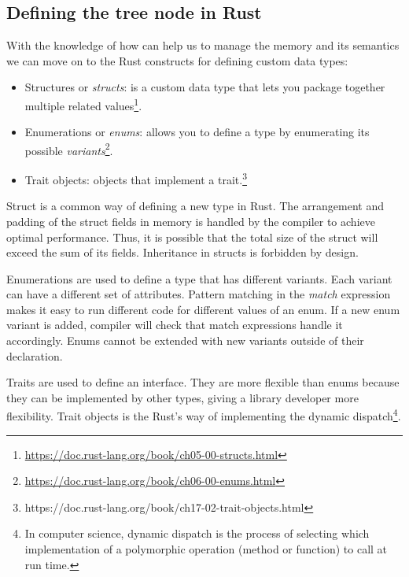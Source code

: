 
\subsection{Defining the tree node in Rust}
With the knowledge of how \rc{} can help us to manage the memory and its semantics we can move on to the Rust constructs for defining custom data types:

\begin{itemize}
    \item Structures or \emph{structs}: is a custom data type that lets you package together multiple related values\footnote{\url{https://doc.rust-lang.org/book/ch05-00-structs.html}}.
    \item Enumerations or \emph{enums}: allows you to define a type by enumerating its possible \emph{variants}\footnote{\url{https://doc.rust-lang.org/book/ch06-00-enums.html}}.
    \item Trait objects: objects that implement a trait.\footnote{https://doc.rust-lang.org/book/ch17-02-trait-objects.html}
\end{itemize}

Struct is a common way of defining a new type in Rust. The arrangement and padding of the struct fields in memory is handled by the compiler to achieve optimal performance. Thus, it is possible that the total size of the struct will exceed the sum of its fields. Inheritance in structs is forbidden by design. 

Enumerations are used to define a type that has different variants. Each variant can have a different set of attributes. Pattern matching in the \emph{match} expression makes it easy to run different code for different values of an enum. If a new enum variant is added, compiler will check that match expressions handle it accordingly. Enums cannot be extended with new variants outside of their declaration.

Traits are used to define an interface. They are more flexible than enums because they can be implemented by other types, giving a library developer more flexibility. Trait objects is the Rust's way of implementing the dynamic dispatch\footnote{In computer science, dynamic dispatch is the process of selecting which implementation of a polymorphic operation (method or function) to call at run time.}.

